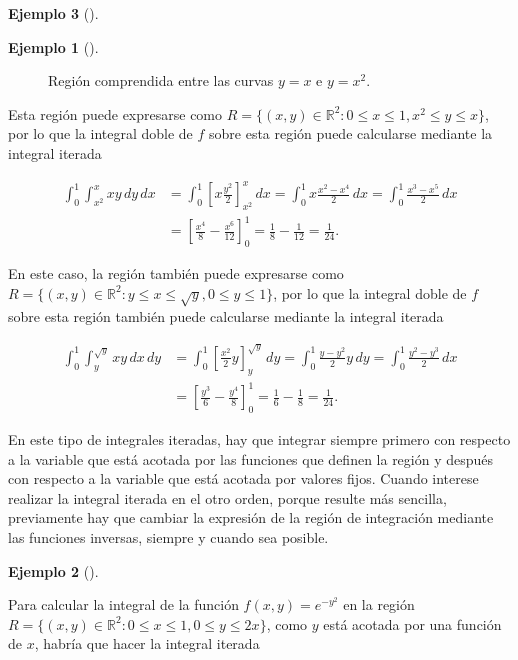 \documentclass[
  a4paper,
]{scrreport}
\theoremstyle{definition}
\newtheorem{example}{Ejemplo}[chapter]
\theoremstyle{plain}
\theoremstyle{definition}
\theoremstyle{definition}
\theoremstyle{plain}
\theoremstyle{plain}
\theoremstyle{remark}
\begin{document}
\begin{example}[]
\begin{example}[]
\begin{figure}[H]
{}

\caption{Región comprendida entre las curvas \(y=x\) e \(y=x^2\).}

\end{figure}%

Esta región puede expresarse como
\(R=\{(x,y)\in \mathbb{R}^2: 0\leq x\leq 1, x^2\leq y\leq x\}\), por lo
que la integral doble de \(f\) sobre esta región puede calcularse
mediante la integral iterada

\begin{align*}
\int_0^1\int_{x^2}^x xy\,dy\,dx
&= \int_0^1 \left[x\frac{y^2}{2}\right]_{x^2}^x\,dx
= \int_0^1 x\frac{x^2-x^4}{2}\,dx
= \int_0^1 \frac{x^3-x^5}{2}\,dx\\
&= \left[\frac{x^4}{8}-\frac{x^6}{12}\right]_0^1
= \frac{1}{8}-\frac{1}{12}
= \frac{1}{24}.
\end{align*}

En este caso, la región también puede expresarse como
\(R=\{(x,y)\in \mathbb{R}^2: y\leq x\leq \sqrt{y}, 0\leq y\leq 1\}\),
por lo que la integral doble de \(f\) sobre esta región también puede
calcularse mediante la integral iterada

\begin{align*}
\int_0^1\int_y^{\sqrt{y}} xy\,dx\,dy
&= \int_0^1 \left[\frac{x^2}{2}y\right]_y^{\sqrt{y}}\,dy
= \int_0^1 \frac{y-y^2}{2}y\,dy
= \int_0^1 \frac{y^2-y^3}{2}\,dx\\
&= \left[\frac{y^3}{6}-\frac{y^4}{8}\right]_0^1
= \frac{1}{6}-\frac{1}{8}
= \frac{1}{24}.
\end{align*}

\end{example}

En este tipo de integrales iteradas, hay que integrar siempre primero
con respecto a la variable que está acotada por las funciones que
definen la región y después con respecto a la variable que está acotada
por valores fijos. Cuando interese realizar la integral iterada en el
otro orden, porque resulte más sencilla, previamente hay que cambiar la
expresión de la región de integración mediante las funciones inversas,
siempre y cuando sea posible.

\begin{example}[]\protect\hypertarget{exm-integral-region-irregular-2}{}\label{exm-integral-region-irregular-2}

Para calcular la integral de la función \(f(x,y)=e^{-y^2}\) en la región
\(R=\{(x,y)\in \mathbb{R}^2: 0\leq x\leq 1, 0\leq y\leq 2x\}\), como
\(y\) está acotada por una función de \(x\), habría que hacer la
integral iterada


\end{example}
\end{example}
\end{document}
